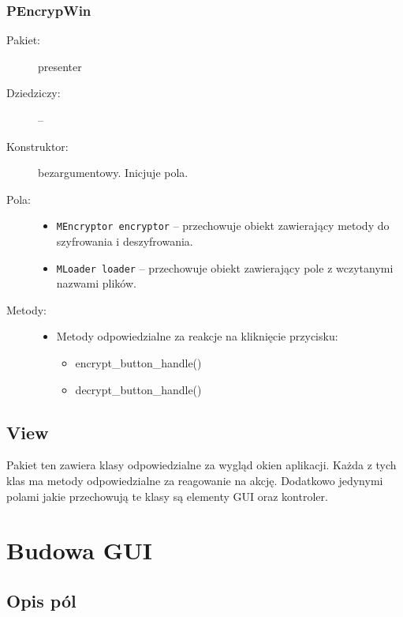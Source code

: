 \documentclass[a4paper]{article}
\newcommand{\prog}{\texttt}
\begin{document}
\subsubsection{PEncrypWin}
\begin{description}
    \item[Pakiet:] presenter
    \item[Dziedziczy:] --
    \item[Konstruktor:] bezargumentowy. Inicjuje pola.
    \item[Pola:] \hfill
    \begin{itemize}
        \item \prog{MEncryptor encryptor} -- przechowuje obiekt zawierający metody do szyfrowania i deszyfrowania.
        \item \prog{MLoader loader} -- przechowuje obiekt zawierający pole z wczytanymi nazwami plików.
    \end{itemize}
    \item[Metody:] \hfill
    \begin{itemize}
        \item Metody odpowiedzialne za reakcje na kliknięcie przycisku:
        \begin{itemize}
            \item encrypt\_button\_handle()
            \item decrypt\_button\_handle()
        \end{itemize}
    \end{itemize}
\end{description}

\subsection{View}
Pakiet ten zawiera klasy odpowiedzialne za wygląd okien aplikacji. Każda z tych klas ma metody odpowiedzialne za reagowanie na akcję. Dodatkowo jedynymi polami jakie przechowują te klasy są elementy GUI oraz kontroler.

\section{Budowa GUI}
\subsection{Opis pól}
\end{document}
